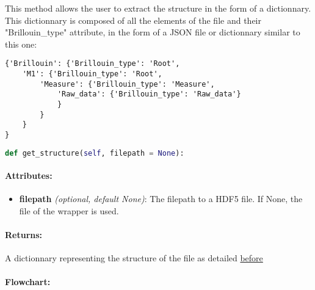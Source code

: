 This method allows the user to extract the structure in the form of a dictionnary. This dictionnary is composed of all the elements of the file and their "Brillouin\_type" attribute, in the form of a JSON file or dictionnary similar to this one:
\begin{verbatim}
{'Brillouin': {'Brillouin_type': 'Root', 
    'M1': {'Brillouin_type': 'Root', 
        'Measure': {'Brillouin_type': 'Measure', 
            'Raw_data': {'Brillouin_type': 'Raw_data'}
            }
        }
    }
}
\end{verbatim}

\begin{lstlisting}[language=Python]
def get_structure(self, filepath = None):
\end{lstlisting}

\paragraph{Attributes:}

\begin{itemize}
    \item \textbf{filepath} \textit{(optional, default None)}: The filepath to a HDF5 file. If None, the file of the wrapper is used.
\end{itemize}

\paragraph{Returns:} A dictionnary representing the structure of the file as detailed \hyperref[subsec:preamble.file_structure.complete_structure]{before}

\paragraph{Flowchart:}

